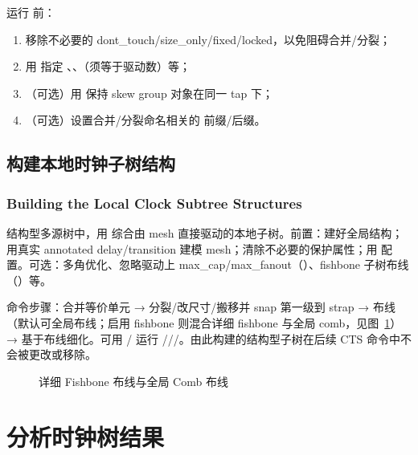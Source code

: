 运行  前：
\begin{enumerate}
  \item 移除不必要的 dont\_touch/size\_only/fixed/locked，以免阻碍合并/分裂；
  \item 用  指定 、、（须等于驱动数）等；
  \item （可选）用  保持 skew group 对象在同一 tap 下；
  \item （可选）设置合并/分裂命名相关的  前缀/后缀。
\end{enumerate}

\subsection{构建本地时钟子树结构}
\subsubsection*{Building the Local Clock Subtree Structures}

结构型多源树中，用  综合由 mesh 直接驱动的本地子树。前置：建好全局结构；用真实 annotated delay/transition 建模 mesh；清除不必要的保护属性；用  配置。可选：多角优化、忽略驱动上 max\_cap/max\_fanout（）、fishbone 子树布线（）等。

命令步骤：合并等价单元 → 分裂/改尺寸/搬移并 snap 第一级到 strap → 布线（默认可全局布线；启用 fishbone 则混合详细 fishbone 与全局 comb，见图~\ref{fig:fish-detail}）→ 基于布线细化。可用 / 运行 ///。由此构建的结构型子树在后续 CTS 命令中不会被更改或移除。

\begin{figure}[htbp]
\centering
{}
\caption{详细 Fishbone 布线与全局 Comb 布线}
\label{fig:fish-detail}
\end{figure}

\section{分析时钟树结果}

